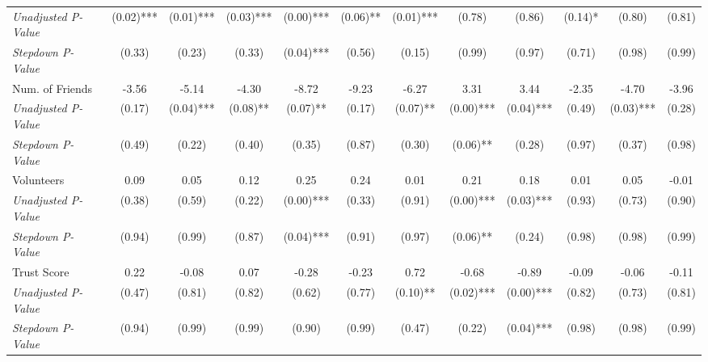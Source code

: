 \begin{tabular}{l c c c c c c c c c c c}
\quad \textit{Unadjusted P-Value} & (0.02)*** & (0.01)*** & (0.03)*** & (0.00)*** & (0.06)** & (0.01)*** & (0.78) & (0.86) & (0.14)* & (0.80) & (0.81) \\
\quad \textit{Stepdown P-Value} & (0.33) & (0.23) & (0.33) & (0.04)*** & (0.56) & (0.15) & (0.99) & (0.97) & (0.71) & (0.98) & (0.99) \\
Num. of Friends & -3.56 & -5.14 & -4.30 & -8.72 & -9.23 & -6.27 & 3.31 & 3.44 & -2.35 & -4.70 & -3.96 \\
\quad \textit{Unadjusted P-Value} & (0.17) & (0.04)*** & (0.08)** & (0.07)** & (0.17) & (0.07)** & (0.00)*** & (0.04)*** & (0.49) & (0.03)*** & (0.28) \\
\quad \textit{Stepdown P-Value} & (0.49) & (0.22) & (0.40) & (0.35) & (0.87) & (0.30) & (0.06)** & (0.28) & (0.97) & (0.37) & (0.98) \\
Volunteers & 0.09 & 0.05 & 0.12 & 0.25 & 0.24 & 0.01 & 0.21 & 0.18 & 0.01 & 0.05 & -0.01 \\
\quad \textit{Unadjusted P-Value} & (0.38) & (0.59) & (0.22) & (0.00)*** & (0.33) & (0.91) & (0.00)*** & (0.03)*** & (0.93) & (0.73) & (0.90) \\
\quad \textit{Stepdown P-Value} & (0.94) & (0.99) & (0.87) & (0.04)*** & (0.91) & (0.97) & (0.06)** & (0.24) & (0.98) & (0.98) & (0.99) \\
Trust Score & 0.22 & -0.08 & 0.07 & -0.28 & -0.23 & 0.72 & -0.68 & -0.89 & -0.09 & -0.06 & -0.11 \\
\quad \textit{Unadjusted P-Value} & (0.47) & (0.81) & (0.82) & (0.62) & (0.77) & (0.10)** & (0.02)*** & (0.00)*** & (0.82) & (0.73) & (0.81) \\
\quad \textit{Stepdown P-Value} & (0.94) & (0.99) & (0.99) & (0.90) & (0.99) & (0.47) & (0.22) & (0.04)*** & (0.98) & (0.98) & (0.99) \\
\bottomrule
\end{tabular}
